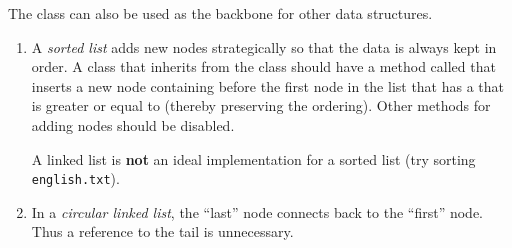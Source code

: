 The  class can also be used as the backbone for other data structures.
%
\begin{enumerate}
\item A \emph{sorted list} adds new nodes strategically so that the data is always kept in order.
A  class that inherits from the  class should have a method called  that inserts a new node containing  before the first node in the list that has a  that is greater or equal to  (thereby preserving the ordering).
Other methods for adding nodes should be disabled.

A linked list is \textbf{not} an ideal implementation for a sorted list (try sorting \texttt{english.txt}).

\item In a \emph{circular linked list}, the ``last'' node connects back to the ``first'' node.
Thus a reference to the tail is unnecessary.
\end{enumerate}
